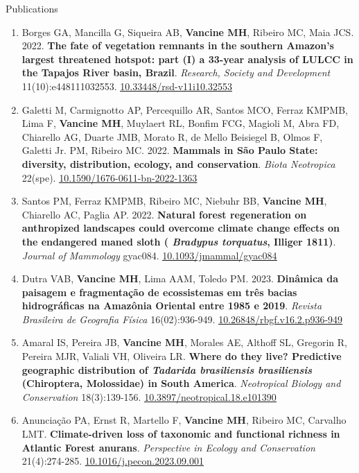 \documentclass{resume}
\begin{document}
\begin{rSection}{Publications}
\begin{enumerate}
\item Borges GA, Mancilla G, Siqueira AB, {\bf Vancine MH}, Ribeiro MC, Maia JCS. 2022. {\bf The fate of vegetation remnants in the southern Amazon’s largest threatened hotspot: part (I) a 33-year analysis of LULCC in the Tapajos River basin, Brazil}. {\it Research, Society and Development} 11(10):e448111032553. \href{https://doi.org/10.33448/rsd-v11i10.32553}{\underline{10.33448/rsd-v11i10.32553}}

\item Galetti M, Carmignotto AP, Percequillo AR, Santos MCO, Ferraz KMPMB, Lima F, {\bf Vancine MH}, Muylaert RL, Bonfim FCG, Magioli M, Abra FD, Chiarello AG, Duarte JMB, Morato R, de Mello Beisiegel B, Olmos F, Galetti Jr. PM, Ribeiro MC. 2022. {\bf Mammals in São Paulo State: diversity, distribution, ecology, and conservation}. {\it Biota Neotropica} 22(spe). \href{https://doi.org/10.1590/1676-0611-bn-2022-1363}{\underline{10.1590/1676-0611-bn-2022-1363}}

\item Santos PM, Ferraz KMPMB, Ribeiro MC, Niebuhr BB, {\bf Vancine MH}, Chiarello AC, Paglia AP. 2022. {\bf Natural forest regeneration on anthropized landscapes could overcome climate change effects on the endangered maned sloth (\textbf{\textit{ Bradypus torquatus}}, Illiger 1811)}. {\it Journal of Mammology} gyac084. \href{https://doi.org/10.1093/jmammal/gyac084}{\underline{10.1093/jmammal/gyac084}}

\item Dutra VAB, {\bf Vancine MH}, Lima AAM, Toledo PM. 2023. {\bf Dinâmica da paisagem e fragmentação de ecossistemas em três bacias hidrográficas na Amazônia Oriental entre 1985 e 2019}. {\it Revista Brasileira de Geografia Física} 16(02):936-949. \href{https://doi.org/10.26848/rbgf.v16.2.p936-949}{\underline{10.26848/rbgf.v16.2.p936-949}}

\item Amaral IS, Pereira JB, {\bf Vancine MH}, Morales AE, Althoff SL, Gregorin R, Pereira MJR, Valiali VH, Oliveira LR. {\bf Where do they live? Predictive geographic distribution of \textbf{\textit{Tadarida brasiliensis brasiliensis}} (Chiroptera, Molossidae) in South America}. {\it Neotropical Biology and Conservation} 18(3):139-156. \href{https://doi.org/10.3897/neotropical.18.e101390}{\underline{10.3897/neotropical.18.e101390}}

\item Anunciação PA, Ernst R, Martello F, {\bf Vancine MH}, Ribeiro MC, Carvalho LMT. {\bf Climate-driven loss of taxonomic and functional richness in Atlantic Forest anurans}. {\it Perspective in Ecology and Conservation} 21(4):274-285. \href{https://doi.org/10.1016/j.pecon.2023.09.001}{\underline{10.1016/j.pecon.2023.09.001}}


\end{enumerate}
\end{rSection}
\end{document}

